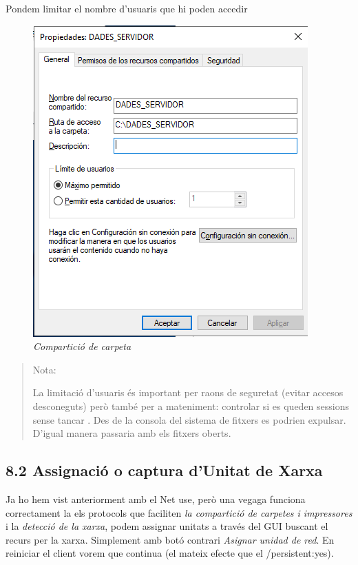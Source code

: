 \documentclass[
  a4paper,
]{article}
\begin{document}
Pondem limitar el nombre d'usuaris que hi poden accedir

\begin{figure}
\centering
\includegraphics{png/Compartir2.png}
\caption{\emph{Compartició de carpeta}}
\end{figure}

\begin{quote}
Nota:

La limitació d'usuaris és important per raons de seguretat (evitar
accesos desconeguts) però també per a mateniment: controlar si es queden
sessions sense tancar . Des de la consola del sistema de fitxers es
podrien expulsar. D'igual manera passaria amb els fitxers oberts.
\end{quote}

\subsection{8.2 Assignació o captura d'Unitat de
Xarxa}\label{assignaciuxf3-o-captura-dunitat-de-xarxa}

Ja ho hem vist anteriorment amb el Net use, però una vegaga funciona
correctament la els protocols que faciliten \emph{la compartició de
carpetes i impressores} i la \emph{detecció de la xarxa}, podem assignar
unitats a través del GUI buscant el recurs per la xarxa. Simplement amb
botó contrari \emph{Asignar unidad de red}. En reiniciar el client vorem
que continua (el mateix efecte que el /persistent:yes).
\end{document}
